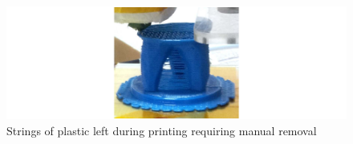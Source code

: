 		\begin{figure}
			\includegraphics[width=1\textwidth]{diagrams/stringing.pdf}
			\caption{Strings of plastic left during printing requiring manual removal}
			\label{fig:stringing}
		\end{figure}
